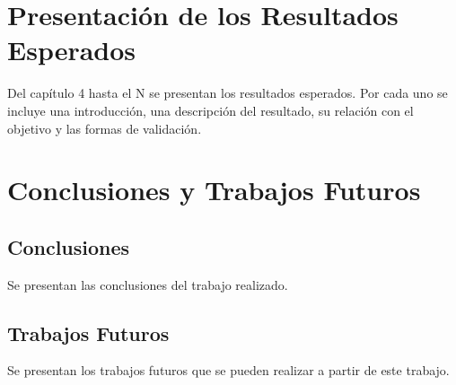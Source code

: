 \section{Presentación de los Resultados Esperados}
\label{sec:resultados_esperados}

Del capítulo 4 hasta el N se presentan los resultados esperados. Por cada uno se incluye una introducción,
una descripción del resultado, su relación con el objetivo y las formas de validación.

\clearpage
\section{Conclusiones y Trabajos Futuros}
\label{sec:conclusiones}

\subsection{Conclusiones}
\label{subsec:conclusiones}

Se presentan las conclusiones del trabajo realizado.

\subsection{Trabajos Futuros}
\label{subsec:trabajos_futuros}

Se presentan los trabajos futuros que se pueden realizar a partir de este trabajo.